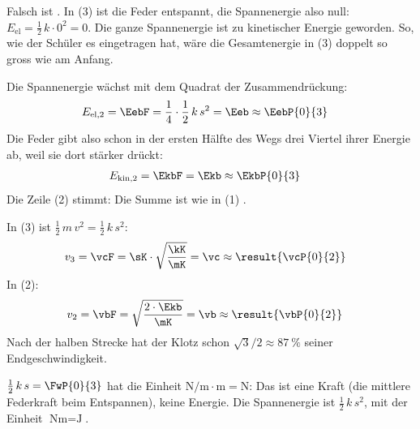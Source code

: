 \begin{abcliste}
\abc
Falsch ist . In (3) ist die Feder entspannt, die Spannenergie also null: $E_\mathrm{el} = \frac{1}{2}\,k\cdot 0^2 = 0$. Die ganze Spannenergie ist zu kinetischer Energie geworden. So, wie der Schüler es eingetragen hat, wäre die Gesamtenergie in (3) doppelt so gross wie am Anfang.

\abc
Die Spannenergie wächst mit dem Quadrat der Zusammendrückung:
\begin{align}
 E_\mathrm{el,2} &= \EebF = \frac{1}{4}\cdot\frac{1}{2}\,k\,s^2 = \Eeb \approx \EebP{0}{3}
\end{align}
Die Feder gibt also schon in der ersten Hälfte des Wegs drei Viertel ihrer Energie ab, weil sie dort stärker drückt:
\begin{align}
 E_\mathrm{kin,2} &= \EkbF = \Ekb \approx \EkbP{0}{3}
\end{align}
Die Zeile (2) stimmt: Die Summe ist wie in (1) .

\abc
In (3) ist $\frac{1}{2}\,m\,v^2 = \frac{1}{2}\,k\,s^2$:
\begin{align}
 v_3 &= \vcF = \sK\cdot\sqrt{\frac{\kK}{\mK}} = \vc \approx \result{\vcP{0}{2}}
\end{align}
In (2):
\begin{align}
 v_2 &= \vbF = \sqrt{\frac{2\cdot\Ekb}{\mK}} = \vb \approx \result{\vbP{0}{2}}
\end{align}
Nach der halben Strecke hat der Klotz schon $\sqrt{3}/2 \approx \SI{87}{\percent}$ seiner Endgeschwindigkeit.

\abc
$\frac{1}{2}\,k\,s = \FwP{0}{3}$ hat die Einheit $\si{\newton\per\meter}\cdot\si{\meter} = \si{\newton}$: Das ist eine Kraft (die mittlere Federkraft beim Entspannen), keine Energie. Die Spannenergie ist $\frac{1}{2}\,k\,s^2$, mit der Einheit $\si{\newton\meter} = \si{\joule}$.
\end{abcliste}
